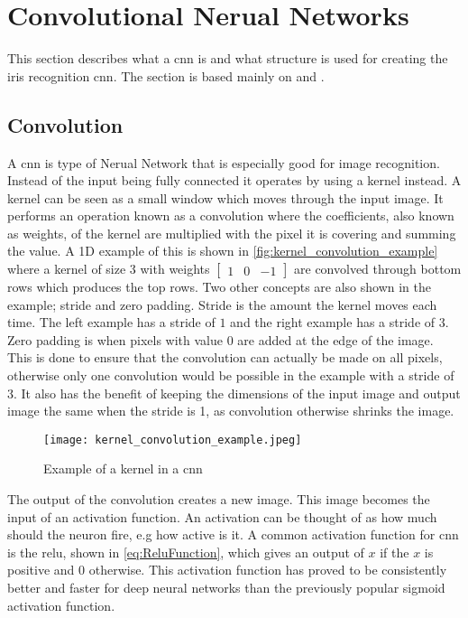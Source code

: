 \section{Convolutional Nerual Networks}
\label{sec:cnn_theory}
This section describes what a \gls{cnn} is and what structure is used for creating the iris recognition \gls{cnn}. The section is based mainly on \cite{Karpathy2016a} and \cite{Nielsen2015}.

\subsection{Convolution}
A \gls{cnn} is type of Nerual Network that is especially good for image recognition. Instead of the input being fully connected it operates by using a kernel instead. A kernel can be seen as a small window which moves through the input image. It performs an operation known as a convolution where the coefficients, also known as weights, of the kernel are multiplied with the pixel it is covering and summing the value. A 1D example of this is shown in \autoref{fig:kernel_convolution_example} where a kernel of size 3 with weights $\begin{bmatrix} 1 & 0 & -1 \end{bmatrix}$ are convolved through bottom rows which produces the top rows. Two other concepts are also shown in the example; stride and zero padding. Stride is the amount the kernel moves each time. The left example has a stride of $1$ and the right example has a stride of $3$. Zero padding is when pixels with value $0$ are added at the edge of the image. This is done to ensure that the convolution can actually be made on all pixels, otherwise only one convolution would be possible in the example with a stride of 3. It also has the benefit of keeping the dimensions of the input image and output image the same when the stride is 1, as convolution otherwise shrinks the image. 

\begin{figure}[h]
	\centering
	\texttt{[image: kernel\_convolution\_example.jpeg]}
	\caption{Example of a kernel in a \gls{cnn} \citep{Karpathy2016a}}
	\label{fig:kernel_convolution_example}
\end{figure}

The output of the convolution creates a new image. This image becomes the input of an activation function. An activation can be thought of as how much should the neuron fire, e.g how active is it. A common activation function for \gls{cnn} is the \gls{relu}, shown in \autoref{eq:ReluFunction}, which gives an output of $x$ if the $x$ is positive and 0 otherwise. This activation function has proved to be consistently better and faster for deep neural networks than the previously popular sigmoid activation function.

